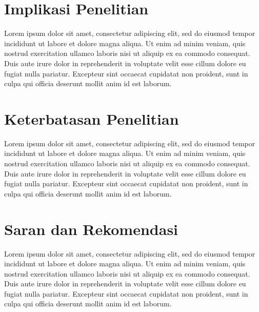 \documentclass[12pt,hidelinks]{report}
\begin{document}
\section{Implikasi Penelitian}
    Lorem ipsum dolor sit amet, consectetur adipiscing elit, sed do eiusmod tempor incididunt ut labore et dolore magna aliqua. Ut enim ad minim veniam, quis nostrud exercitation ullamco laboris nisi ut aliquip ex ea commodo consequat. Duis aute irure dolor in reprehenderit in voluptate velit esse cillum dolore eu fugiat nulla pariatur. Excepteur sint occaecat cupidatat non proident, sunt in culpa qui officia deserunt mollit anim id est laborum. 

\section{Keterbatasan Penelitian}
    Lorem ipsum dolor sit amet, consectetur adipiscing elit, sed do eiusmod tempor incididunt ut labore et dolore magna aliqua. Ut enim ad minim veniam, quis nostrud exercitation ullamco laboris nisi ut aliquip ex ea commodo consequat. Duis aute irure dolor in reprehenderit in voluptate velit esse cillum dolore eu fugiat nulla pariatur. Excepteur sint occaecat cupidatat non proident, sunt in culpa qui officia deserunt mollit anim id est laborum. 

\section{Saran dan Rekomendasi}
    Lorem ipsum dolor sit amet, consectetur adipiscing elit, sed do eiusmod tempor incididunt ut labore et dolore magna aliqua. Ut enim ad minim veniam, quis nostrud exercitation ullamco laboris nisi ut aliquip ex ea commodo consequat. Duis aute irure dolor in reprehenderit in voluptate velit esse cillum dolore eu fugiat nulla pariatur. Excepteur sint occaecat cupidatat non proident, sunt in culpa qui officia deserunt mollit anim id est laborum. 
\end{document}
